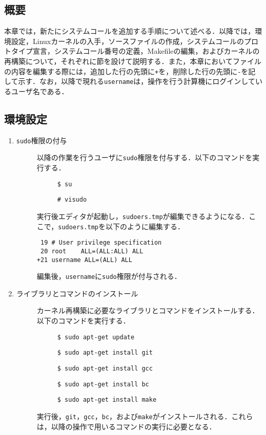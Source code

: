\documentclass[12pt]{jsarticle}
\begin{document}
\subsection{概要}
本章では，新たにシステムコールを追加する手順について述べる．以降では，環境設定，Linuxカーネルの入手，ソースファイルの作成，システムコールのプロトタイプ宣言，システムコール番号の定義，Makefileの編集，およびカーネルの再構築について，それぞれに節を設けて説明する．また，本章においてファイルの内容を編集する際には，追加した行の先頭に\verb|+|を，削除した行の先頭に\verb|-|を記して示す．なお，以降で現れる\verb|username|は，操作を行う計算機にログインしているユーザ名である．
\subsection{環境設定}
\begin{enumerate}
\item \verb|sudo|権限の付与
  \begin{description}
  \item[] 以降の作業を行うユーザに\verb|sudo|権限を付与する．以下のコマンドを実行する．
    \begin{description}
    \item[] \verb|$ su|
    \item[] \verb|# visudo|
    \end{description}
  \item[] 実行後エディタが起動し，\verb|sudoers.tmp|が編集できるようになる．ここで，\verb|sudoers.tmp|を以下のように編集する．
\begin{verbatim}
 19 # User privilege specification
 20 root    ALL=(ALL:ALL) ALL
+21 username ALL=(ALL) ALL
\end{verbatim}
    \item[] 編集後，\verb|username|に\verb|sudo|権限が付与される．
  \end{description}
\item ライブラリとコマンドのインストール
  \begin{description}
  \item[] カーネル再構築に必要なライブラリとコマンドをインストールする．以下のコマンドを実行する．
    \begin{description}
    \item[] \verb|$ sudo apt-get update|
    \item[] \verb|$ sudo apt-get install git|
    \item[] \verb|$ sudo apt-get install gcc|
    \item[] \verb|$ sudo apt-get install bc |
    \item[] \verb|$ sudo apt-get install make|
    \end{description}
  \item[] 実行後，\verb|git|，\verb|gcc|，\verb|bc|，および\verb|make|がインストールされる．これらは，以降の操作で用いるコマンドの実行に必要となる．
  \end{description}
\end{enumerate}
\end{document}
